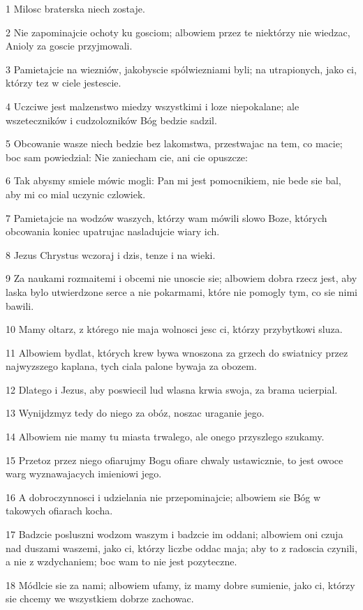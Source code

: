 \par 1 Milosc braterska niech zostaje.
\par 2 Nie zapominajcie ochoty ku gosciom; albowiem przez te niektórzy nie wiedzac, Anioly za goscie przyjmowali.
\par 3 Pamietajcie na wiezniów, jakobyscie spólwiezniami byli; na utrapionych, jako ci, którzy tez w ciele jestescie.
\par 4 Uczciwe jest malzenstwo miedzy wszystkimi i loze niepokalane; ale wszeteczników i cudzolozników Bóg bedzie sadzil.
\par 5 Obcowanie wasze niech bedzie bez lakomstwa, przestwajac na tem, co macie; boc sam powiedzial: Nie zaniecham cie, ani cie opuszcze:
\par 6 Tak abysmy smiele mówic mogli: Pan mi jest pomocnikiem, nie bede sie bal, aby mi co mial uczynic czlowiek.
\par 7 Pamietajcie na wodzów waszych, którzy wam mówili slowo Boze, których obcowania koniec upatrujac nasladujcie wiary ich.
\par 8 Jezus Chrystus wczoraj i dzis, tenze i na wieki.
\par 9 Za naukami rozmaitemi i obcemi nie unoscie sie; albowiem dobra rzecz jest, aby laska bylo utwierdzone serce a nie pokarmami, które nie pomogly tym, co sie nimi bawili.
\par 10 Mamy oltarz, z którego nie maja wolnosci jesc ci, którzy przybytkowi sluza.
\par 11 Albowiem bydlat, których krew bywa wnoszona za grzech do swiatnicy przez najwyzszego kaplana, tych ciala palone bywaja za obozem.
\par 12 Dlatego i Jezus, aby poswiecil lud wlasna krwia swoja, za brama ucierpial.
\par 13 Wynijdzmyz tedy do niego za obóz, noszac uraganie jego.
\par 14 Albowiem nie mamy tu miasta trwalego, ale onego przyszlego szukamy.
\par 15 Przetoz przez niego ofiarujmy Bogu ofiare chwaly ustawicznie, to jest owoce warg wyznawajacych imieniowi jego.
\par 16 A dobroczynnosci i udzielania nie przepominajcie; albowiem sie Bóg w takowych ofiarach kocha.
\par 17 Badzcie posluszni wodzom waszym i badzcie im oddani; albowiem oni czuja nad duszami waszemi, jako ci, którzy liczbe oddac maja; aby to z radoscia czynili, a nie z wzdychaniem; boc wam to nie jest pozyteczne.
\par 18 Módlcie sie za nami; albowiem ufamy, iz mamy dobre sumienie, jako ci, którzy sie chcemy we wszystkiem dobrze zachowac.
